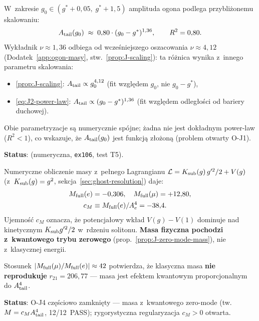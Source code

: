 \begin{proposition}\label{prop:J2-nu}
W~zakresie $g_0 \in (g^* + 0{,}05,\; g^* + 1{,}5)$ amplituda ogona
podlega przybli\.zonemu skalowaniu:
\begin{equation}\label{eq:J2-power-law}
  A_{\rm tail}(g_0) \;\approx\; 0{,}80 \cdot (g_0 - g^*)^{1{,}36},
  \qquad R^2 = 0{,}80.
\end{equation}
Wyk\l{}adnik $\nu \approx 1{,}36$ odbiega od wcze\'sniejszego oszacowania
$\nu \approx 4{,}12$ (Dodatek~\ref{app:ogon-masy}, stw.~\ref{prop:J-scaling}):
ta r\'o\.znica wynika z~innego parametru skalowania:
\begin{itemize}[nosep]
  \item \ref{prop:J-scaling}: $A_{\rm tail} \propto g_0^{4{,}12}$
    (fit wzgl\k{e}dem $g_0$, nie $g_0 - g^*$),
  \item \eqref{eq:J2-power-law}: $A_{\rm tail} \propto (g_0 - g^*)^{1{,}36}$
    (fit wzgl\k{e}dem odleg\l{}o\'sci od bariery duchowej).
\end{itemize}
Obie parametryzacje s\k{a} numerycznie sp\'ojne; \.zadna nie jest
dok\l{}adnym power-law ($R^2 < 1$), co wskazuje, \.ze
$A_{\rm tail}(g_0)$ jest funkcj\k{a} z\l{}o\.zon\k{a}
(problem otwarty O-J1).

\textbf{Status}:  (numeryczna, \texttt{ex106}, test T5).
\end{proposition}

\begin{remark}\label{rem:J2-cM}
Numeryczne obliczenie masy z~pe\l{}nego Lagrangianu
$\mathcal{L} = K_{\rm sub}(g)\,g'^2/2 + V(g)$ (z~$K_{\rm sub}(g) = g^2$,
sekcja~\ref{sec:ghost-resolution}) daje:
\begin{align}
  M_{\rm full}(e) &= -0{,}306, \quad
  M_{\rm full}(\mu) = +12{,}80, \\
  c_M &\equiv M_{\rm full}(e) / A_e^4 = -38{,}4.
\end{align}
Ujemno\'s\'c $c_M$ oznacza, \.ze potencja\l{}owy wk\l{}ad $V(g) - V(1)$
dominuje nad kinetycznym $K_{\rm sub} g'^2/2$ w~rdzeniu solitonu.
\textbf{Masa fizyczna pochodzi z~kwantowego trybu zerowego}
(prop.~\ref{prop:J-zero-mode-mass}), nie z~klasycznej energii.

Stosunek $|M_{\rm full}(\mu)/M_{\rm full}(e)| \approx 42$ potwierdza,
\.ze klasyczna masa \textbf{nie reprodukuje} $r_{21} = 206{,}77$
--- masa jest efektem kwantowym proporcjonalnym do $A_{\rm tail}^4$.

\textbf{Status}: O-J4 cz\k{e}\'sciowo zamkni\k{e}ty --- masa z~kwantowego
zero-mode (tw.~$M = c_M A_{\rm tail}^4$, 12/12~PASS);
rygorystyczna regularyzacja $c_M > 0$ otwarta.
\end{remark}

